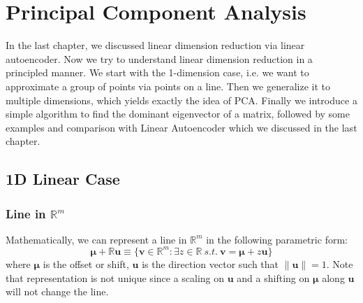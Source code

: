 \documentclass[../main.tex]{subfiles}
\begin{document}

\chapter{Principal Component Analysis}
In the last chapter, we discussed linear dimension reduction via linear autoencoder. Now we try to understand linear dimension reduction in a principled manner. We start with the 1-dimension case, i.e. we want to approximate a group of points via points on a line. Then we generalize it to multiple dimensions, which yields exactly the idea of PCA. Finally we introduce a simple algorithm to find the dominant eigenvector of a matrix, followed by some examples and comparison with Linear Autoencoder which we discussed in the last chapter.
\section{1D Linear Case}
\subsection{Line in $\mathbb{R}^m$}
Mathematically, we can represent a line in $\mathbb{R}^m$ in the following parametric form:
\begin{equation*}
\bm{\mu} + \mathbb{R}\bm{u} \equiv \{\bm{v}\in \mathbb{R}^m:\exists z\in \mathbb{R}\ s.t.\ \bm{v}=\bm{\mu} + z\bm{u} \}
\end{equation*}
where $\bm{\mu}$ is the offset or shift, $\bm{u}$ is the direction vector such that $\|\bm{u}\|=1$. Note that representation is not unique since a scaling on $\bm{u}$ and a shifting on $\bm{\mu}$ along $\bm{u}$ will not change the line. 
\end{document}
